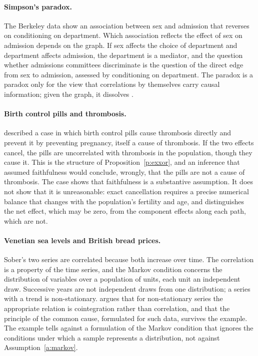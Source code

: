 \documentclass{situationist-preprint}
\begin{document}
\paragraph{Simpson's paradox.} The Berkeley data show an association between sex and admission that reverses on conditioning on department. Which association reflects the effect of sex on admission depends on the graph. If sex affects the choice of department and department affects admission, the department is a mediator, and the question whether admissions committees discriminate is the question of the direct edge from sex to admission, assessed by conditioning on department. The paradox is a paradox only for the view that correlations by themselves carry causal information; given the graph, it dissolves \citep[ch.~6]{Pearl2009}.

\paragraph{Birth control pills and thrombosis.} \citet{Hesslow1976} described a case in which birth control pills cause thrombosis directly and prevent it by preventing pregnancy, itself a cause of thrombosis. If the two effects cancel, the pills are uncorrelated with thrombosis in the population, though they cause it. This is the structure of Proposition~\ref{p:exxor}, and an inference that assumed faithfulness would conclude, wrongly, that the pills are not a cause of thrombosis. The case shows that faithfulness is a substantive assumption. It does not show that it is unreasonable: exact cancellation requires a precise numerical balance that changes with the population's fertility and age, and \citet{Hitchcock2001} distinguishes the net effect, which may be zero, from the component effects along each path, which are not.

\paragraph{Venetian sea levels and British bread prices.} Sober's two series are correlated because both increase over time. The correlation is a property of the time series, and the Markov condition concerns the distribution of variables over a population of units, each unit an independent draw. Successive years are not independent draws from one distribution; a series with a trend is non-stationary. \citet{Hoover2003} argues that for non-stationary series the appropriate relation is cointegration rather than correlation, and that the principle of the common cause, formulated for such data, survives the example. The example tells against a formulation of the Markov condition that ignores the conditions under which a sample represents a distribution, not against Assumption~\ref{a:markov}.
\end{document}
